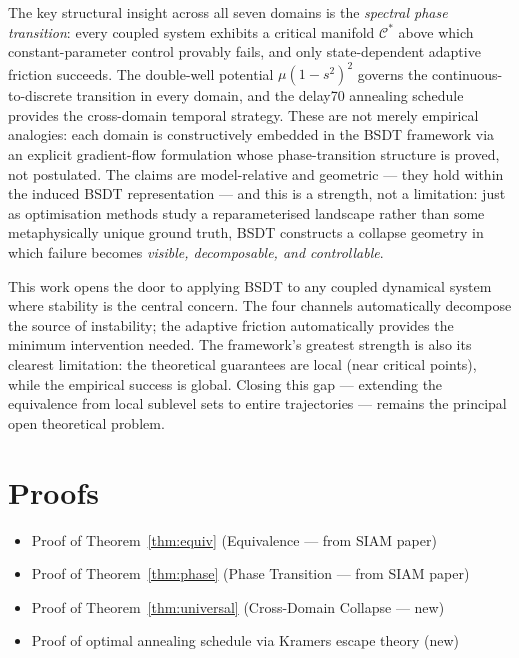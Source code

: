 \documentclass[11pt,a4paper]{article}
\newcommand{\Cman}{\mathcal{C}^*}
\begin{document}
The key structural insight across all seven domains is the \emph{spectral
phase transition}: every coupled system exhibits a critical manifold
$\Cman$ above which constant-parameter control provably fails, and only
state-dependent adaptive friction succeeds.  The double-well potential
$\mu(1-s^2)^2$ governs the continuous-to-discrete transition in every
domain, and the delay70 annealing schedule provides the cross-domain
temporal strategy.  These are not merely empirical analogies:
each domain is constructively embedded in the BSDT framework
via an explicit gradient-flow formulation whose phase-transition
structure is proved, not postulated.  The claims are model-relative
and geometric --- they hold within the induced BSDT representation --- and
this is a strength, not a limitation: just as optimisation methods study
a reparameterised landscape rather than some metaphysically unique
ground truth, BSDT constructs a collapse geometry in which failure
becomes \emph{visible, decomposable, and controllable}.

This work opens the door to applying BSDT to any coupled dynamical
system where stability is the central concern.  The four channels
automatically decompose the source of instability; the adaptive
friction automatically provides the minimum intervention needed.
The framework's greatest strength is also its clearest limitation:
the theoretical guarantees are local (near critical points), while
the empirical success is global.  Closing this gap --- extending the
equivalence from local sublevel sets to entire trajectories ---
remains the principal open theoretical problem.


\appendix

\section{Proofs}\label{app:proofs}
\begin{itemize}[nosep]
  \item Proof of Theorem~\ref{thm:equiv} (Equivalence — from SIAM paper)
  \item Proof of Theorem~\ref{thm:phase} (Phase Transition — from SIAM paper)
  \item Proof of Theorem~\ref{thm:universal} (Cross-Domain Collapse --- new)
  \item Proof of optimal annealing schedule via Kramers escape theory (new)
\end{itemize}
\end{document}
